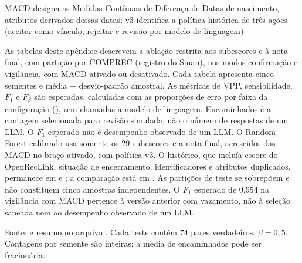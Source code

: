 MACD designa as Medidas Contínuas de Diferença de Datas de nascimento, atributos derivados dessas datas; v3 identifica a política histórica de três ações (aceitar como vínculo, rejeitar e revisão por modelo de linguagem).

As tabelas deste apêndice descrevem a ablação restrita aos subescores e à nota final, com partição por COMPREC (registro do Sinan), nos modos confirmação e vigilância, com MACD ativado ou desativado. Cada tabela apresenta cinco sementes e média $\pm$ desvio-padrão amostral. As métricas de VPP, sensibilidade, $F_1$ e $F_\beta$ são esperadas, calculadas com as proporções de erro por faixa da configuração (), sem chamadas a modelo de linguagem. Encaminhados é a contagem selecionada para revisão simulada, não o número de respostas de um LLM. O $F_1$ esperado não é desempenho observado de um LLM. O Random Forest calibrado usa somente os 29 subescores e a nota final, acrescidos das MACD no braço ativado, com política v3. O histórico, que incluía escore do OpenRecLink, situação de encerramento, identificadores e atributos duplicados, permanece em  e ; a comparação está em . As partições de teste se sobrepõem e não constituem cinco amostras independentes. O $F_1$ esperado de 0,954 na vigilância com MACD pertence à versão anterior com vazamento, não à seleção saneada nem ao desempenho observado de um LLM.

\begin{table}[htbp]
\centering
\caption{Ablação restrita aos subescores e à nota final, com partição por COMPREC (registro do Sinan), MACD ativado (Medidas Contínuas de Diferença de Datas de nascimento), modo confirmação (maior custo para falso positivo): métricas esperadas, sem chamadas a modelo de linguagem.}
\label{tab:ablacao-comprec-confirmacao-macd-on}
\small
{}
\par\footnotesize Fonte:  e resumo no arquivo . Cada teste contém 74 pares verdadeiros. $\beta=0{,}5$. Contagens por semente são inteiras; a média de encaminhados pode ser fracionária.
\end{table}

